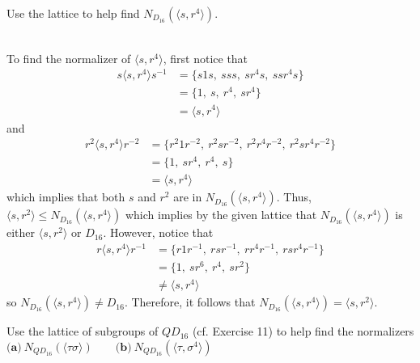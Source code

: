 \begin{exercise}
    Use the lattice to help find $N_{D_{16}}(\langle s, r^4 \rangle)$.\\
\end{exercise}

\begin{solution}
    \\ To find the normalizer of $\langle s, r^4 \rangle$, first notice that 
    \begin{align*}
        s\langle s, r^4 \rangle s^{-1} &= \{s1s, \ sss, \ sr^4s, \ ssr^4s\} \\
        &= \{1, \ s, \ r^4, \ sr^4\} \\
        &= \langle s, r^4 \rangle
    \end{align*}
    and 
    \begin{align*}
        r^2\langle s, r^4 \rangle r^{-2} &= \{r^2 1r^{-2}, \ r^2 sr^{-2}, \ r^2 r^4 r^{-2}, \ r^2 sr^4 r^{-2}\} \\
        &= \{1, \ sr^4, \ r^4, \ s\} \\
        &= \langle s, r^4 \rangle
    \end{align*}
    which implies that both $s$ and $r^2$ are in $N_{D_{16}}(\langle s, r^4 \rangle)$. Thus, $\langle s, r^2 \rangle \leq N_{D_{16}}(\langle s, r^4 \rangle)$ which implies by the given lattice that $N_{D_{16}}(\langle s, r^4 \rangle)$ is either $\langle s, r^2 \rangle$ or $D_{16}$. However, notice that 
    \begin{align*}
        r\langle s, r^4 \rangle r^{-1} &= \{r 1 r^{-1}, \ r sr^{-1}, \ r r^4 r^{-1}, \ r sr^4 r^{-1}\} \\
        &= \{1, \ sr^6, \ r^4, \ sr^2\} \\
        &\neq \langle s, r^4 \rangle
    \end{align*}
    so $N_{D_{16}}(\langle s, r^4 \rangle) \neq D_{16}$. Therefore, it follows that $N_{D_{16}}(\langle s, r^4 \rangle) = \langle s, r^2 \rangle$. \\ 
\end{solution}

\begin{exercise}
    Use the lattice of subgroups of $QD_{16}$ (cf. Exercise 11) to help find the normalizers \\
    $\textbf{(a)} \ N_{QD_{16}}(\langle \tau\sigma \rangle) \qquad \textbf{(b)} \ N_{QD_{16}}(\langle \tau, \sigma^4 \rangle)$ \\
\end{exercise}

